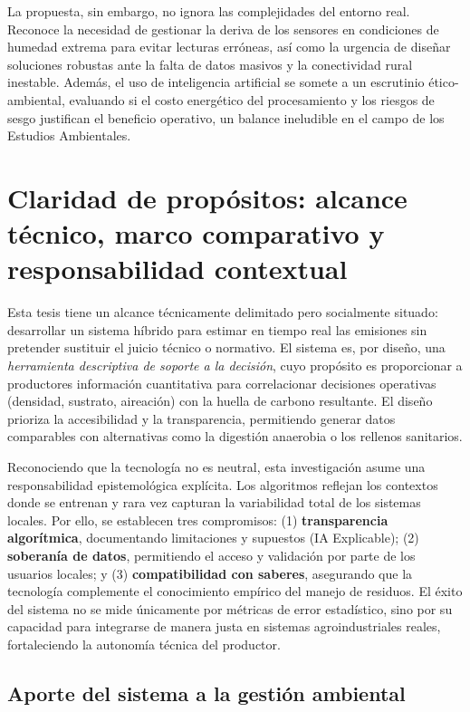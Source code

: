 La propuesta, sin embargo, no ignora las complejidades del entorno real. Reconoce la necesidad de gestionar la deriva de los sensores en condiciones de humedad extrema para evitar lecturas erróneas, así como la urgencia de diseñar soluciones robustas ante la falta de datos masivos y la conectividad rural inestable. Además, el uso de inteligencia artificial se somete a un escrutinio ético-ambiental, evaluando si el costo energético del procesamiento y los riesgos de sesgo justifican el beneficio operativo, un balance ineludible en el campo de los Estudios Ambientales.

\section*{Claridad de propósitos: alcance técnico, marco comparativo y responsabilidad contextual}

Esta tesis tiene un alcance técnicamente delimitado pero socialmente situado: desarrollar un sistema híbrido para estimar en tiempo real las emisiones sin pretender sustituir el juicio técnico o normativo. El sistema es, por diseño, una \textit{herramienta descriptiva de soporte a la decisión}, cuyo propósito es proporcionar a productores información cuantitativa para correlacionar decisiones operativas (densidad, sustrato, aireación) con la huella de carbono resultante. El diseño prioriza la accesibilidad y la transparencia, permitiendo generar datos comparables con alternativas como la digestión anaerobia o los rellenos sanitarios.

Reconociendo que la tecnología no es neutral, esta investigación asume una responsabilidad epistemológica explícita. Los algoritmos reflejan los contextos donde se entrenan y rara vez capturan la variabilidad total de los sistemas locales. Por ello, se establecen tres compromisos: (1) \textbf{transparencia algorítmica}, documentando limitaciones y supuestos (IA Explicable); (2) \textbf{soberanía de datos}, permitiendo el acceso y validación por parte de los usuarios locales; y (3) \textbf{compatibilidad con saberes}, asegurando que la tecnología complemente el conocimiento empírico del manejo de residuos. El éxito del sistema no se mide únicamente por métricas de error estadístico, sino por su capacidad para integrarse de manera justa en sistemas agroindustriales reales, fortaleciendo la autonomía técnica del productor.

\subsection*{Aporte del sistema a la gestión ambiental}

